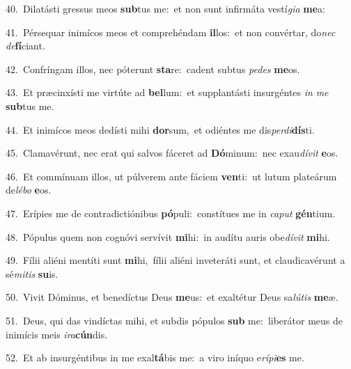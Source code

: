 {\numbfont\textcolor{\numbcolor}{40.}}~Dilatásti gressus meos \textbf{sub}\-tus me:~\star et non sunt infirmáta vestí\-\textit{gi}\-\textit{a} \textbf{me}\-a:\par
{\numbfont\textcolor{\numbcolor}{41.}}~Pérsequar inimícos meos et comprehéndam \textbf{il}\-los:~\star et non convértar, do\textit{nec} \textit{de}\-\textbf{fí}ciant.\par
{\numbfont\textcolor{\numbcolor}{42.}}~Confríngam illos, nec póterunt \textbf{sta}\-re:~\star cadent subtus \textit{pe}\-\textit{des} \textbf{me}\-os.\par
{\numbfont\textcolor{\numbcolor}{43.}}~Et præcinxísti me virtúte ad \textbf{bel}\-lum:~\star et supplantásti insurgéntes \textit{in} \textit{me} \textbf{sub}\-tus me.\par
{\numbfont\textcolor{\numbcolor}{44.}}~Et inimícos meos dedísti mihi \textbf{dor}\-sum,~\star et odiéntes me dis\-\textit{per}\-\textit{di}\textbf{dís}ti.\par
{\numbfont\textcolor{\numbcolor}{45.}}~Clamavérunt, nec erat qui salvos fáceret ad \textbf{Dó}\-minum:~\star nec exau\-\textit{dí}\-\textit{vit} \textbf{e}\-os.\par
{\numbfont\textcolor{\numbcolor}{46.}}~Et commínuam illos, ut púlverem ante fáciem \textbf{ven}\-ti:~\star ut lutum plateárum de\-\textit{lé}\-\textit{bo} \textbf{e}\-os.\par
{\numbfont\textcolor{\numbcolor}{47.}}~Erípies me de contradictiónibus \textbf{pó}\-puli:~\star constítues me in \textit{ca}\-\textit{put} \textbf{gén}\-tium.\par
{\numbfont\textcolor{\numbcolor}{48.}}~Pópulus quem non cognóvi servívit \textbf{mi}\-hi:~\star in audítu auris obe\-\textit{dí}\-\textit{vit} \textbf{mi}\-hi.\par
{\numbfont\textcolor{\numbcolor}{49.}}~Fílii aliéni mentíti sunt \textbf{mi}\-hi,~\star fílii aliéni inveteráti sunt, et claudicavérunt a sé\-\textit{mi}\-\textit{tis} \textbf{su}\-is.\par
{\numbfont\textcolor{\numbcolor}{50.}}~Vivit Dóminus, et benedíctus Deus \textbf{me}\-us:~\star et exaltétur Deus sa\-\textit{lú}\-\textit{tis} \textbf{me}\-æ.\par
{\numbfont\textcolor{\numbcolor}{51.}}~Deus, qui das vindíctas mihi, et subdis pópulos \textbf{sub} me:~\star liberátor meus de inimícis meis \textit{i}\-\textit{ra}\textbf{cún}dis.\par
{\numbfont\textcolor{\numbcolor}{52.}}~Et ab insurgéntibus in me exal\-\textbf{tá}\-bis me:~\star a viro iníquo e\-\textit{rí}\-\textit{pi}\textbf{es} me.\par
